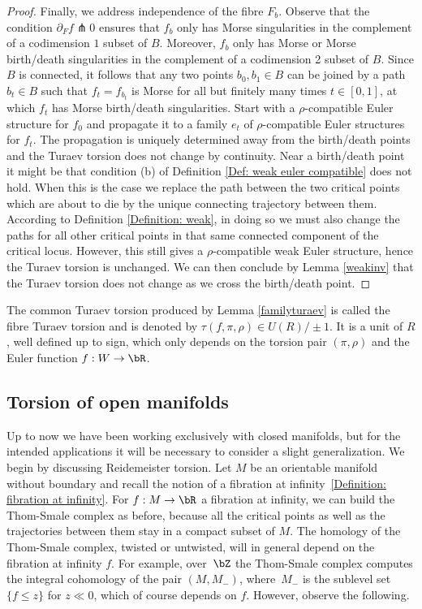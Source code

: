 \begin{proof}
Finally, we address independence of the fibre $F_b$. Observe that the condition \hbox{$\partial_F f \pitchfork 0$} ensures that $f_b$ only has Morse singularities in the complement of a codimension $1$ subset of $B$. Moreover, $f_b$ only has Morse or Morse birth/death singularities in the complement of a codimension 2 subset of $B$. Since $B$ is connected, it follows that any two points $b_0, b_1 \in B$ can be joined by a path $b_t \in B$ such that $f_t=f_{b_t}$ is Morse for all but finitely many times $t\in [0,1]$, at which $f_t$ has Morse birth/death singularities. Start with a $\rho$-compatible Euler structure for $f_0$ and propagate it to a family $e_t$ of $\rho$-compatible Euler structures for $f_t$. The propagation is uniquely determined away from the birth/death points and the Turaev torsion does not change by continuity. Near a birth/death point it might be that condition (b) of Definition \ref{Def: weak euler compatible} does not hold. When this is the case we replace the path between the two critical points which are about to die by the unique connecting trajectory between them. According to Definition \ref{Definition: weak}, in doing so we must also change the paths for all other critical points in that same connected component of the critical locus. However, this still gives a $\rho$-compatible weak Euler structure, hence the Turaev torsion is unchanged. We can then conclude by Lemma \ref{weakinv} that the Turaev torsion does not change as we cross the birth/death point. \end{proof}

\begin{definition}
The common Turaev torsion produced by Lemma \ref{familyturaev} is called the fibre Turaev torsion and is denoted by $\tau(f,\pi, \rho) \in U(R) / \pm 1$. It is a unit of $R$, well defined up to sign, which only depends on the torsion pair $(\pi, \rho)$ and the Euler function $f:W \to \bR$.
\end{definition}

\subsection{Torsion of open manifolds}

Up to now we have been working exclusively with closed manifolds, but for the intended applications it will be necessary to consider a slight generalization. We begin by discussing Reidemeister torsion. Let $M$ be an orientable manifold without boundary and recall the notion of a fibration at infinity~\ref{Definition: fibration at infinity}. For $f:M \to \bR$ a fibration at infinity, we can build the Thom-Smale complex as before, because all the critical points as well as the trajectories between them stay in a compact subset of $M$. The homology of the Thom-Smale complex, twisted or untwisted, will in general depend on the fibration at infinity $f$. For example, over~$\bZ$ the Thom-Smale complex computes the integral cohomology of the pair $(M,M_{-})$, where~$M_{-}$ is the sublevel set $\{ f \leq z \}$ for $z\ll0$, which of course depends on $f$. However, observe the following.

